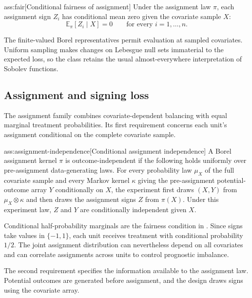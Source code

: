 \begin{assumptionv}{ass:fair}[Conditional fairness of assignment]
Under the assignment law \(\pi\), each assignment sign \(Z_i\) has conditional mean zero given the covariate sample \(X\):
\[
\mathbb E_\pi[Z_i\mid X]=0
\qquad\text{for every }i=1,\ldots,n.
\]
\end{assumptionv}

The finite-valued Borel representatives permit evaluation at sampled covariates. Uniform sampling makes changes on Lebesgue null sets immaterial to the expected loss, so the class retains the usual almost-everywhere interpretation of Sobolev functions.

\subsection{Assignment and signing loss}

The assignment family combines covariate-dependent balancing with equal marginal treatment probabilities. Its first requirement concerns each unit's assignment conditional on the complete covariate sample.

\begin{assumptionv}{ass:assignment-independence}[Conditional assignment independence]
A Borel assignment kernel \(\pi\) is outcome-independent if the following holds uniformly over pre-assignment data-generating laws. For every probability law \(\mu_X\) of the full covariate sample and every Markov kernel \(\kappa\) giving the pre-assignment potential-outcome array \(Y\) conditionally on \(X\), the experiment first draws \((X,Y)\) from \(\mu_X\otimes\kappa\) and then draws the assignment signs \(Z\) from \(\pi(X)\). Under this experiment law, \(Z\) and \(Y\) are conditionally independent given \(X\).
\end{assumptionv}

Conditional half-probability marginals are the fairness condition in \citep[Definition 2.2]{Cytrynbaum2026Limits}. Since signs take values in \(\{-1,1\}\), each unit receives treatment with conditional probability \(1/2\). The joint assignment distribution can nevertheless depend on all covariates and can correlate assignments across units to control prognostic imbalance.

The second requirement specifies the information available to the assignment law. Potential outcomes are generated before assignment, and the design draws signs using the covariate array.

